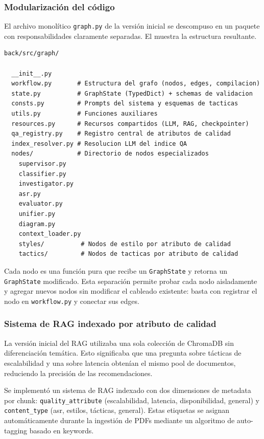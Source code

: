 \documentclass[12pt, letterpaper, oneside]{article}
\begin{document}
\subsubsection{Modularización del código}
\label{sssec:modularizacion}

El archivo monolítico \texttt{graph.py} de la versión inicial se descompuso en un
paquete con responsabilidades claramente separadas. El 
muestra la estructura resultante.

\begin{lstlisting}[language={}, caption={Estructura del paquete \texttt{graph/} tras la modularización}, label={lst:estructura-graph}]
back/src/graph/

  __init__.py
  workflow.py       # Estructura del grafo (nodos, edges, compilacion)
  state.py          # GraphState (TypedDict) + schemas de validacion
  consts.py         # Prompts del sistema y esquemas de tacticas
  utils.py          # Funciones auxiliares
  resources.py      # Recursos compartidos (LLM, RAG, checkpointer)
  qa_registry.py    # Registro central de atributos de calidad
  index_resolver.py # Resolucion LLM del indice QA
  nodes/            # Directorio de nodos especializados
    supervisor.py    
    classifier.py    
    investigator.py
    asr.py           
    evaluator.py     
    unifier.py
    diagram.py       
    context_loader.py
    styles/          # Nodos de estilo por atributo de calidad
    tactics/         # Nodos de tacticas por atributo de calidad
\end{lstlisting}

Cada nodo es una función pura que recibe un \texttt{GraphState} y retorna un
\texttt{GraphState} modificado. Esta separación permite probar cada nodo
aisladamente y agregar nuevos nodos sin modificar el cableado existente: basta
con registrar el nodo en \texttt{workflow.py} y conectar sus edges.

\subsubsection{Sistema de RAG indexado por atributo de calidad}
\label{sssec:rag-indexado}

La versión inicial del RAG utilizaba una sola colección de ChromaDB sin
diferenciación temática. Esto significaba que una pregunta sobre tácticas de
escalabilidad y una sobre latencia obtenían el mismo pool de documentos, reduciendo
la precisión de las recomendaciones.

Se implementó un sistema de RAG indexado con dos dimensiones de metadata por chunk:
\texttt{quality\_attribute} (escalabilidad, latencia, disponibilidad, general) y
\texttt{content\_type} (asr, estilos, tácticas, general). Estas etiquetas se
asignan automáticamente durante la ingestión de PDFs mediante un algoritmo de
auto-tagging basado en keywords.
\end{document}
